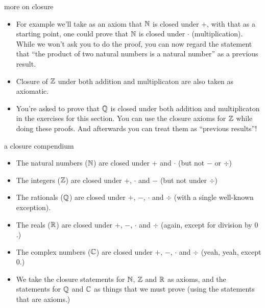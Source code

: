 \documentclass[landscape]{beamer}
\begin{document}
\begin{frame}{more on closure}
\begin{itemize}
\item For example we'll take as an axiom that ${\mathbb N}$ is closed under $+$, with that as a starting point, one could prove that ${\mathbb N}$ is closed under $\cdot$ (multiplication).  \pause While we won't ask you to do the proof, you can now regard the statement that ``the product of two natural numbers is a natural number'' as a previous result. \pause
\item Closure of ${\mathbb Z}$ under both addition and multiplicaton are also taken as axiomatic. \pause
\item You're asked to prove that ${\mathbb Q}$ is closed under both addition and multiplicaton in the exercises for this section. \pause \newline
You can use the closure axioms for ${\mathbb Z}$ while doing these proofs. \pause \newline
And afterwards you can treat them as ``previous results''!
\end{itemize}
\end{frame}

\begin{frame}{a closure compendium}
\begin{itemize}
\item The natural numbers (${\mathbb N}$) are closed under $+$ and $\cdot$ (but not $-$ or $\div$) \pause
\item The integers (${\mathbb Z}$) are closed under $+$, $\cdot$ and $-$ (but not under $\div$) \pause
\item The rationals (${\mathbb Q}$) are closed under $+$, $-$, $\cdot$ and $\div$ (with a single well-known exception).\pause
\item The reals (${\mathbb R}$) are closed under $+$, $-$, $\cdot$ and $\div$ \pause (again, except for division by $0$.)\pause
\item The complex numbers (${\mathbb C}$) are closed under $+$, $-$, $\cdot$ and $\div$ \pause (yeah, yeah, except $0$.)\pause
\item We take the closure statements for ${\mathbb N}$, ${\mathbb Z}$ and ${\mathbb R}$ as axioms, and the statements for ${\mathbb Q}$ and ${\mathbb C}$ as things that we must prove (using the statements that are axioms.)
\end{itemize}
\end{frame}
\end{document}
